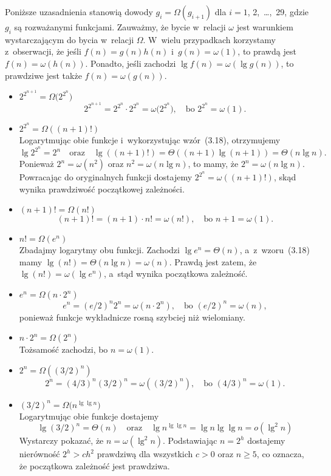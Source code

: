 \subproblem %
Poniższe uzasadnienia stanowią dowody $g_i=\Omega(g_{i+1})$ dla $i=1$, 2,~\dots,~29, gdzie $g_i$ są rozważanymi funkcjami. Zauważmy, że bycie w~relacji $\omega$ jest warunkiem wystarczającym do bycia w~relacji $\Omega$. W~wielu przypadkach korzystamy z~obserwacji, że jeśli $f(n)=g(n)h(n)$ i~$g(n)=\omega(1)$, to prawdą jest $f(n)=\omega(h(n))$. Ponadto, jeśli zachodzi $\lg f(n)=\omega(\lg g(n))$, to prawdziwe jest także $f(n)=\omega(g(n))$.
\begin{itemize}
\item $2^{2^{n+1}}=\Omega\bigl(2^{2^n}\bigr)$
	\[
		2^{2^{n+1}} = 2^{2^n}\cdot2^{2^n} = \omega\bigl(2^{2^n}\bigr), \quad\text{bo $2^{2^n} = \omega(1)$}.
	\]
\item $2^{2^n}=\Omega((n+1)!)$ \\
	Logarytmując obie funkcje i~wykorzystując wzór~(3.18), otrzymujemy
	\[
		\lg 2^{2^n} = 2^n \quad\text{oraz}\quad \lg((n+1)!) = \Theta((n+1)\lg(n+1)) = \Theta(n\lg n).
	\]
	Ponieważ $2^n=\omega(n^2)$ oraz $n^2=\omega(n\lg n)$, to mamy, że $2^n=\omega(n\lg n)$. Powracając do oryginalnych funkcji dostajemy $2^{2^n}=\omega((n+1)!)$, skąd wynika prawdziwość początkowej zależności.
\item $(n+1)!=\Omega(n!)$
	\[
		(n+1)! = (n+1)\cdot n! = \omega(n!), \quad\text{bo $n+1 = \omega(1)$}.
	\]
\item $n!=\Omega(e^n)$ \\
	Zbadajmy logarytmy obu funkcji. Zachodzi $\lg e^n=\Theta(n)$, a~z~wzoru~(3.18) mamy $\lg(n!)=\Theta(n\lg n)=\omega(n)$. Prawdą jest zatem, że $\lg(n!)=\omega(\lg e^n)$, a~stąd wynika początkowa zależność.
\item $e^n=\Omega(n\cdot2^n)$
	\[
		e^n = (e/2)^n2^n = \omega(n\cdot2^n), \quad\text{bo $(e/2)^n = \omega(n)$},
	\]
	ponieważ funkcje wykładnicze rosną szybciej niż wielomiany.
\item $n\cdot2^n=\Omega(2^n)$ \\
	Tożsamość zachodzi, bo $n=\omega(1)$.
\item $2^n=\Omega((3/2)^n)$
	\[
		2^n = (4/3)^n(3/2)^n = \omega((3/2)^n), \quad\text{bo $(4/3)^n = \omega(1)$}.
	\]
\item $(3/2)^n=\Omega\bigl(n^{\lg\lg n}\bigr)$ \\
	Logarytmując obie funkcje dostajemy
	\[
		\lg(3/2)^n = \Theta(n) \quad\text{oraz}\quad \lg n^{\lg\lg n} = \lg n\lg\lg n = o(\lg^2n)
	\]
	Wystarczy pokazać, że $n=\omega(\lg^2n)$. Podstawiając $n=2^h$ dostajemy nierówność $2^h>ch^2$ prawdziwą dla wszystkich $c>0$ oraz $n\ge5$, co oznacza, że początkowa zależność jest prawdziwa.

\end{itemize}
